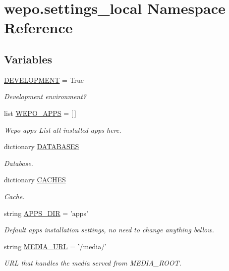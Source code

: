 \hypertarget{namespacewepo_1_1settings__local}{\section{wepo.\-settings\-\_\-local Namespace Reference}
\label{namespacewepo_1_1settings__local}
}
\subsection*{Variables}
\begin{DoxyCompactItemize}
\item 
\hyperlink{namespacewepo_1_1settings__local_ab901350a2926e04c72533eb35929e544}{D\-E\-V\-E\-L\-O\-P\-M\-E\-N\-T} = True
\begin{DoxyCompactList}\small\item\em Development environment? \end{DoxyCompactList}\item 
list \hyperlink{namespacewepo_1_1settings__local_a2a6dd2eb093d78609eb8995efb98d166}{W\-E\-P\-O\-\_\-\-A\-P\-P\-S} = \mbox{[}$\,$\mbox{]}
\begin{DoxyCompactList}\small\item\em Wepo apps List all installed apps here. \end{DoxyCompactList}\item 
dictionary \hyperlink{namespacewepo_1_1settings__local_a0ddad315e1cafe9c0abdddc17f245c32}{D\-A\-T\-A\-B\-A\-S\-E\-S}
\begin{DoxyCompactList}\small\item\em Database. \end{DoxyCompactList}\item 
dictionary \hyperlink{namespacewepo_1_1settings__local_a8d75a3f9cf538fd56aebc0439129325d}{C\-A\-C\-H\-E\-S}
\begin{DoxyCompactList}\small\item\em Cache. \end{DoxyCompactList}\item 
string \hyperlink{namespacewepo_1_1settings__local_a75935e5d1b35b2475ca23bd142553a2f}{A\-P\-P\-S\-\_\-\-D\-I\-R} = 'apps'
\begin{DoxyCompactList}\small\item\em Default apps installation settings, no need to change anything bellow. \end{DoxyCompactList}\item 
string \hyperlink{namespacewepo_1_1settings__local_a1f16861da0c8d2a2e984d57e5ea2b784}{M\-E\-D\-I\-A\-\_\-\-U\-R\-L} = '/media/'
\begin{DoxyCompactList}\small\item\em U\-R\-L that handles the media served from M\-E\-D\-I\-A\-\_\-\-R\-O\-O\-T. \end{DoxyCompactList}\end{DoxyCompactItemize}


